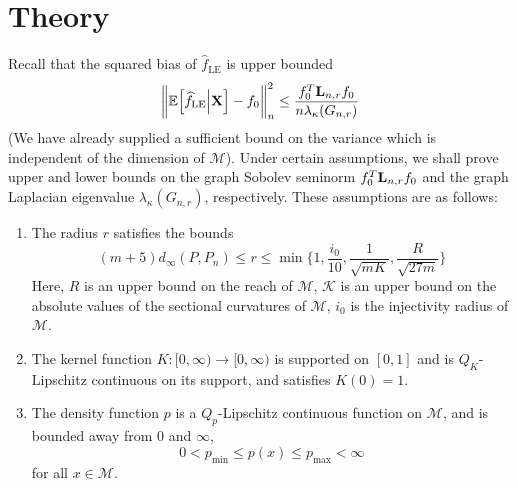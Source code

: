 \documentclass{article}
\newcommand{\1}{\mathbf{1}}
\newcommand{\Lap}{{\bf L}}
\newcommand{\Ebb}{\mathbb{E}}
\newcommand{\wh}[1]{\widehat{#1}}
\newcommand{\mc}[1]{\mathcal{#1}}
\newcommand{\LE}{\mathrm{LE}}
\theoremstyle{alden}
\theoremstyle{aldenthm}
\theoremstyle{definition}
\theoremstyle{remark}
\begin{document}
\section{Theory}
Recall that the squared bias of $\wh{f}_{\LE}$ is upper bounded
\begin{equation}
\label{eqn:squared_bias}
\biggl\|\Ebb\Bigl[\wh{f}_{\LE} \Big | {\bf X}\Bigr] - f_0\biggr\|_n^2 \leq \frac{f_0^T \Lap_{n,r} f_0}{n \lambda_{\kappa}(G_{n,r})}
\end{equation}
(We have already supplied a sufficient bound on the variance which is independent of the dimension of $\mc{M}$). Under certain assumptions, we shall prove upper and lower bounds on the graph Sobolev seminorm $f_0^T \Lap_{n,r} f_0$ and the graph Laplacian eigenvalue $\lambda_{\kappa}(G_{n,r})$, respectively. These assumptions are as follows:
\begin{enumerate}[label=(A\arabic*)]
	\item 
	\label{asmp:max_radius}
	The radius $r$ satisfies the bounds
	\begin{equation*}
	(m + 5)d_{\infty}(P,P_n)\leq r \leq \min\biggl\{1,\frac{i_0}{10},\frac{1}{\sqrt{mK}},\frac{R}{\sqrt{27m}}\biggr\}
	\end{equation*}
	Here, $R$ is an upper bound on the reach of $\mc{M}$, $\mc{K}$ is an upper bound on the absolute values of the sectional curvatures of $\mc{M}$, $i_0$ is the injectivity radius of $\mc{M}$. 
	\item
	\label{asmp:kernel_shape}
	The kernel function $K: [0,\infty) \to [0,\infty)$ is supported on $[0,1]$ and is $Q_K$-Lipschitz continuous on its support, and satisfies $K(0) = 1$.
	\item
	\label{asmp:density}
	The density function $p$ is a $Q_p$-Lipschitz continuous function on $\mc{M}$, and is bounded away from $0$ and $\infty$,
	\begin{equation*}
	0 < p_{\min} \leq p(x) \leq p_{\max} < \infty
	\end{equation*}
	for all $x \in \mc{M}$.
\end{enumerate}
\end{document}
